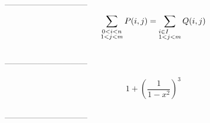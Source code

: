 \documentclass{article}
\begin{document}
  \begin{center}
  ------------------------------\\
  \begin{displaymath}
    \sum_{\substack{0<i< n \\ 1<j<m}}
    P(i,j)=
    \sum_{\begin{subarray}{1}
        i \in I\\
        1<j<m
      \end{subarray}}
      Q(i,j)
  \end{displaymath}
  \\
  ------------------------------
  \end{center}
  \begin{center}
  \begin{displaymath}
    1 + \left( \frac{1}{1-x^2}
    \right)^3
  \end{displaymath}
  \\
  ------------------------------
  \end{center}
\end{document}
